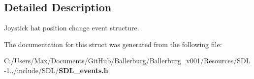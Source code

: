 \subsection{Detailed Description}
Joystick hat position change event structure. 

The documentation for this struct was generated from the following file\+:\begin{DoxyCompactItemize}
\item 
C\+:/\+Users/\+Max/\+Documents/\+Git\+Hub/\+Ballerburg/\+Ballerburg\+\_\+v001/\+Resources/\+S\+D\+L-\/1../include/\+S\+D\+L/{\bf S\+D\+L\+\_\+events.\+h}\end{DoxyCompactItemize}
